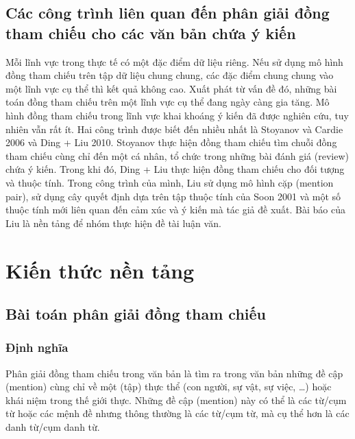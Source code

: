 \documentclass[12pt]{extarticle}
\begin{document}
		\subsection{Các công trình liên quan đến phân giải đồng tham chiếu cho các văn bản chứa ý kiến}
			\par Mỗi lĩnh vực trong thực tế có một đặc điểm dữ liệu riêng. Nếu sử dụng mô hình đồng tham chiếu trên tập dữ liệu chung chung, các đặc điểm chung chung vào một lĩnh vực cụ thể thì kết quả không cao. Xuất phát từ vấn đề đó, những bài toán đồng tham chiếu trên một lĩnh vực cụ thể đang ngày càng gia tăng. Mô hình đồng tham chiếu trong lĩnh vực khai khoáng ý kiến đã được nghiên cứu, tuy nhiên vẫn rất ít. Hai công trình được biết đến nhiều nhất là Stoyanov và Cardie 2006 và Ding + Liu 2010. Stoyanov thực hiện đồng tham chiếu tìm chuỗi đồng tham chiếu cùng chỉ đến một cá nhân, tổ chức trong những bài đánh giá (review) chứa ý kiến.  Trong khi đó, Ding + Liu thực hiện đồng tham chiếu cho đối tượng và thuộc tính. Trong công trình của mình, Liu sử dụng mô hình cặp (mention pair), sử dụng cây quyết định dựa trên tập thuộc tính của Soon 2001 và một số thuộc tính mới liên quan đến cảm xúc và ý kiến mà tác giả đề xuất. Bài báo của Liu là nền tảng để nhóm thực hiện đề tài luận văn.		

	\section{Kiến thức nền tảng}
		\subsection{Bài toán phân giải đồng tham chiếu}
			\label{coref_problem}
			\subsubsection*{Định nghĩa}
				Phân giải đồng tham chiếu trong văn bản là tìm ra trong văn bản những đề cập (mention) cùng chỉ về một (tập) thực thể (con người, sự vật, sự việc, …) hoặc khái niệm trong thế giới thực. Những đề cập (mention) này có thể là các từ/cụm từ hoặc các mệnh đề nhưng thông thường là các từ/cụm từ, mà cụ thể hơn là các danh từ/cụm danh từ.
\end{document}

